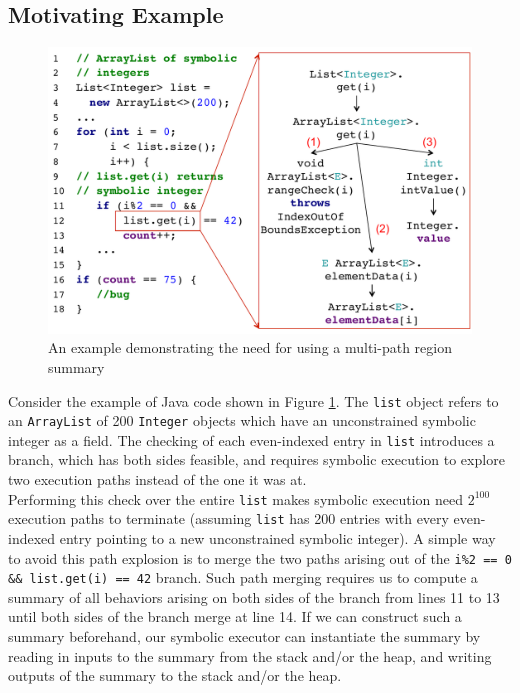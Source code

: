 \subsection{Motivating Example}
\begin{figure}
    \includegraphics[width=\textwidth]{figures/example-combined.pdf}
    \caption{An example demonstrating the need for using a multi-path region summary}
    \label{fig:mot-example}
\end{figure}
Consider the example of Java code shown in Figure \ref{fig:mot-example}.
%
The {\tt list} object refers to an {\tt ArrayList} of 200 {\tt Integer} objects which have an unconstrained symbolic
integer as a field.
%
The checking of each even-indexed entry in {\tt list} introduces a branch, which has both sides feasible, and requires
symbolic execution to explore two execution paths instead of the one it was at.\\
%
Performing this check over the entire {\tt list} makes symbolic execution need $2^{100}$ execution paths to terminate
(assuming {\tt list} has 200 entries with every even-indexed entry pointing to a new unconstrained symbolic integer).
%
A simple way to avoid this path explosion is to merge the two paths arising out of the {\tt i\%2 == 0 \&\& list.get(i) == 42} branch.
%
Such path merging requires us to compute a summary of all behaviors arising on both sides of the branch from lines 11 to 13
until both sides of the branch merge at line 14.
%
If we can construct such a summary beforehand, our symbolic executor can instantiate the summary by reading in inputs to
the summary from the stack and/or the heap, and writing outputs of the summary to the stack and/or the heap.\\
